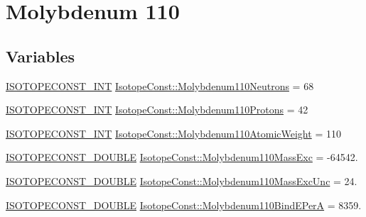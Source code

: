\hypertarget{group___isotope_const-_molybdenum-_mo110}{}\section{Molybdenum 110}
\label{group___isotope_const-_molybdenum-_mo110}
\subsection*{Variables}
\begin{DoxyCompactItemize}
\item 
\mbox{\hyperlink{group___isotope_const-_macros_ga5f18360b3e99483a35c32d789e62621c}{I\+S\+O\+T\+O\+P\+E\+C\+O\+N\+S\+T\+\_\+\+I\+NT}} \mbox{\hyperlink{group___isotope_const-_molybdenum-_mo110_ga8f18d03a03bee47d579ff2f24e305c66}{Isotope\+Const\+::\+Molybdenum110\+Neutrons}} = 68
\item 
\mbox{\hyperlink{group___isotope_const-_macros_ga5f18360b3e99483a35c32d789e62621c}{I\+S\+O\+T\+O\+P\+E\+C\+O\+N\+S\+T\+\_\+\+I\+NT}} \mbox{\hyperlink{group___isotope_const-_molybdenum-_mo110_ga838af28d03b7ef34dcd3b94bc61e59c3}{Isotope\+Const\+::\+Molybdenum110\+Protons}} = 42
\item 
\mbox{\hyperlink{group___isotope_const-_macros_ga5f18360b3e99483a35c32d789e62621c}{I\+S\+O\+T\+O\+P\+E\+C\+O\+N\+S\+T\+\_\+\+I\+NT}} \mbox{\hyperlink{group___isotope_const-_molybdenum-_mo110_ga9287d63ca28447359de074e211c7e140}{Isotope\+Const\+::\+Molybdenum110\+Atomic\+Weight}} = 110
\item 
\mbox{\hyperlink{group___isotope_const-_macros_ga8f45a7272ce02c0b4c65c44636ed719a}{I\+S\+O\+T\+O\+P\+E\+C\+O\+N\+S\+T\+\_\+\+D\+O\+U\+B\+LE}} \mbox{\hyperlink{group___isotope_const-_molybdenum-_mo110_ga330ac09b6454119f8d3e6896bb3f1d9e}{Isotope\+Const\+::\+Molybdenum110\+Mass\+Exc}} = -\/64542.
\item 
\mbox{\hyperlink{group___isotope_const-_macros_ga8f45a7272ce02c0b4c65c44636ed719a}{I\+S\+O\+T\+O\+P\+E\+C\+O\+N\+S\+T\+\_\+\+D\+O\+U\+B\+LE}} \mbox{\hyperlink{group___isotope_const-_molybdenum-_mo110_ga6c30cd1fc4d57ffe8547b0d874406f75}{Isotope\+Const\+::\+Molybdenum110\+Mass\+Exc\+Unc}} = 24.
\item 
\mbox{\hyperlink{group___isotope_const-_macros_ga8f45a7272ce02c0b4c65c44636ed719a}{I\+S\+O\+T\+O\+P\+E\+C\+O\+N\+S\+T\+\_\+\+D\+O\+U\+B\+LE}} \mbox{\hyperlink{group___isotope_const-_molybdenum-_mo110_ga7782231e9c8ff011977784bd48fcb8b2}{Isotope\+Const\+::\+Molybdenum110\+Bind\+E\+PerA}} = 8359.

\end{DoxyCompactItemize}
